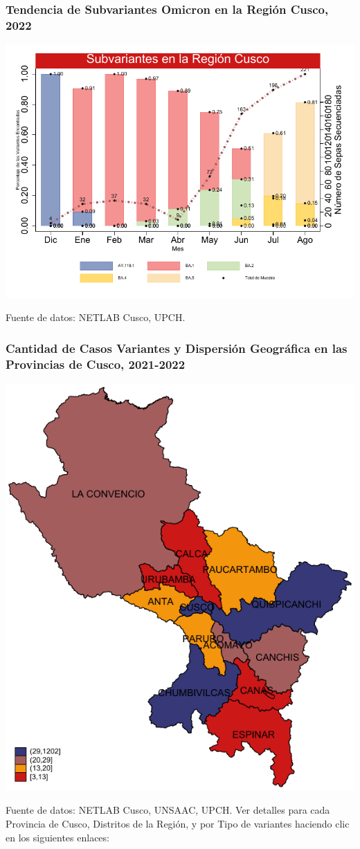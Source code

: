 \documentclass[xcolor=table]{beamer}
\begin{document}
	\begin{frame}[label=subvariantes]
		\frametitle{Tendencia de Subvariantes Omicron en la Región Cusco, 2022}
		\vspace{-.5cm}
		\begin{center}
			\includegraphics[width=0.85\linewidth]{../figuras/subvariantes.pdf}
		\end{center}
		{\tiny Fuente de datos: NETLAB Cusco, UPCH.}
	\end{frame}

	\begin{frame}[label=mapa_variantes]
		\frametitle{Cantidad de Casos Variantes y Dispersión Geográfica en las Provincias de Cusco, 2021-2022}
		\begin{center}
		\includegraphics[width=0.4\linewidth]{../figuras/variantes_provincial.pdf}
		\end{center}
		{\tiny Fuente de datos: NETLAB Cusco, UNSAAC, UPCH.}	
		Ver detalles para cada  Provincia de Cusco, Distritos de la Región, y por Tipo de variantes haciendo clic en los siguientes enlaces:
		\hyperlink{mapa_provincia_cusco}{} \hyperlink{mapa_distrital}{} \hyperlink{mapa_lambda}{}
		\hyperlink{mapa_gamma}{}
		\hyperlink{mapa_delta}{}
		\hyperlink{mapa_delta}{}
	\end{frame}
\end{document}
